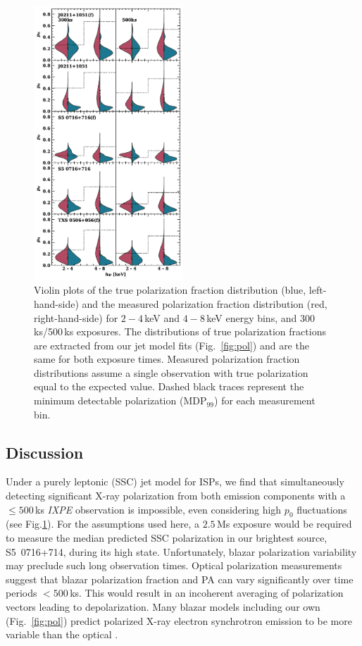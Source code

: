 \begin{figure}
    \centering
    \includegraphics[width=0.5\textwidth]{figures/violin.pdf}
    \caption{Violin plots of the true polarization fraction distribution (blue, left-hand-side) and the measured polarization fraction distribution (red, right-hand-side) for $2-4$\,keV and $4-8$\,keV energy bins, and 300\,ks/500\,ks exposures. The distributions of true polarization fractions are extracted from our jet model fits (Fig.~\ref{fig:pol}) and are the same for both exposure times. Measured polarization fraction distributions assume a single observation with true polarization equal to the expected value.
    Dashed black traces represent the minimum detectable polarization (MDP$_{99}$) for each measurement bin. }
    \label{fig:meas}
\end{figure}

\subsection{Discussion} 
\label{sec:disc}
Under a purely leptonic (SSC) jet model for ISPs, we find that simultaneously detecting significant X-ray polarization from both emission components with a $\leq500$\,ks {\it IXPE} observation is impossible, even considering high $p_0$ fluctuations (see Fig.\ref{fig:meas}). 
For the assumptions used here, a $2.5$\,Ms exposure would be required to measure the median predicted SSC polarization in our brightest source, S5~0716+714, during its high state.
Unfortunately, blazar polarization variability may preclude such long observation times. Optical polarization measurements \citep{blinov_robopol_2021} suggest that blazar polarization fraction and PA can vary significantly over time periods $<500$\,ks. This would result in an incoherent averaging of polarization vectors leading to depolarization. Many blazar models \citep{marscher_turbulent_2014} including our own (Fig.~\ref{fig:pol}) predict polarized X-ray electron synchrotron emission to be more variable than the optical \citep{di_gesu_testing_2022}.

